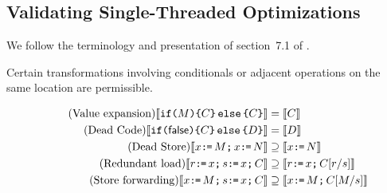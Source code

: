 \subsection{Validating Single-Threaded Optimizations}
We follow the terminology and presentation of section~7.1 of
\citet{Dolan:2018:BDR:3192366.3192421}.  

Certain transformations involving conditionals or adjacent operations on the same location are permissible. 
 
 \begin{align*}
   \tag{Value expansion}
  \sem{\IF{\aExp}\THEN\aCmd\ELSE\aCmd\FI} &=
  \sem{\aCmd}  \\
  \tag{Dead Code} 
  \sem{\IF{\FALSE}\THEN\aCmd\ELSE\bCmd\FI} &=
  \sem{\bCmd} \\
  \tag{Dead Store} 
  \sem{\aLoc \GETS \aExp \SEMI \aLoc  \GETS \bExp} &\supseteq 
  \sem{\aLoc \GETS \bExp}\\    
  \tag{Redundant load}
  \sem{\aReg \GETS \aLoc  \SEMI \bReg \GETS \aLoc  \SEMI \aCmd} &\supseteq
  \sem{\aReg \GETS \aLoc \SEMI \aCmd[\aReg/\bReg]} \\
  \tag{Store forwarding} 
  \sem{\aLoc \GETS \aExp \SEMI \bReg \GETS \aLoc \SEMI \aCmd} &\supseteq 
  \sem{\aLoc \GETS \aExp \SEMI \aCmd[\aExp/\bReg]}
\end{align*}

